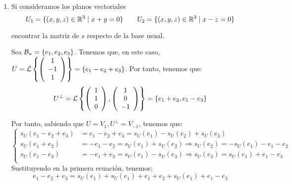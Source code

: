 \documentclass[12pt]{article}
\begin{document}
\begin{ejercicio}
\begin{enumerate}
        \item Si consideramos los planos vectoriales
        \begin{equation*}
            U_1 = \{(x, y, z) \in \mathbb{R}^3 \mid x + y = 0\}
            \qquad
            U_2 = \{(x, y, z) \in \mathbb{R}^3 \mid x - z = 0\}
        \end{equation*}

        encontrar la matriz de $s$ respecto de la base usual.

        Sea $\mathcal{B}_u=\{e_1, e_2, e_3\}$. Tenemos que, en este caso, $U=\mathcal{L}\left\{\left(\begin{array}{c}
            1 \\ -1 \\ 1
        \end{array}\right)\right\} = \{e_1-e_2+e_3\}$. Por tanto, tenemos que:
        \begin{equation*}
            U^\perp = \mathcal{L}\left\{
            \left(\begin{array}{c}
                1 \\ 1 \\ 0
            \end{array}\right),
            \left(\begin{array}{c}
                1 \\ 0 \\ -1
            \end{array}\right)
            \right\} = \{e_1+e_2, e_1-e_3\}
        \end{equation*}

        Por tanto, sabiendo que $U=V_1, U^\perp = V_{-1}$, tenemos que:
        \begin{equation*}
            \left\{\begin{array}{rl}
                s_U(e_1-e_2+e_3) &= e_1-e_2+e_3 = s_U(e_1) -s_U(e_2) + s_U(e_3) \\
                s_U(e_1+e_2) &= -e_1-e_2 = s_U(e_1) +s_U(e_2) \Longrightarrow s_U(e_2) = -s_U(e_1)-e_1-e_2\\
                s_U(e_1-e_3) &= -e_1+e_3 = s_U(e_1) -s_U(e_3) \Longrightarrow s_U(e_3)=s_U(e_1)+e_1-e_3\\
            \end{array}\right.
        \end{equation*}
        Sustituyendo en la primera ecuación, tenemos:
        \begin{equation*}
            e_1-e_2+e_3 = s_U(e_1) +s_U(e_1)+e_1+e_2 + s_U(e_1)+e_1-e_3
        \end{equation*}


\end{enumerate}
\end{ejercicio}
\end{document}
